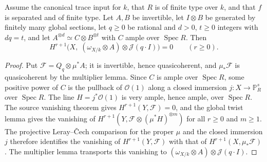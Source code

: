 \begin{theorem}
\label{thm:kn-relative-nadel-multiplier-vanishing}
\leanok
Assume the canonical trace input for $k$, that $R$ is of finite type over $k$,
and that $f$ is separated and of finite type. Let $A,B$ be invertible, let
$I\otimes B$ be generated by finitely many global sections, let $q\geq0$ be
rational and $d>0$, $t\geq0$ integers with $dq=t$, and let
$A^{\otimes d}\simeq C\otimes B^{\otimes t}$ with $C$ ample over
$\operatorname{Spec}R$. Then
\[
 H^{r+1}\bigl(X,\;(\omega_{X/k}\otimes A)\otimes\mathcal J(q\cdot I)\bigr)=0
 \qquad(r\geq0).
\]
\end{theorem}
\begin{proof}
Put $\mathcal F=Q_q\otimes\mu^*A$; it is invertible, hence quasicoherent, and
$\mu_*\mathcal F$ is quasicoherent by the multiplier lemma. Since $C$ is ample
over $\operatorname{Spec}R$, some positive power of $C$ is the pullback of
$\mathcal O(1)$ along a closed immersion $j:X\to\mathbb P^s_R$ over
$\operatorname{Spec}R$. The line $H=j^*\mathcal O(1)$ is very ample, hence
ample, over $\operatorname{Spec}R$. The source vanishing theorem gives
$H^{r+1}(Y,\mathcal F)=0$, and the global twist lemma gives the vanishing of
$H^{r+1}(Y,\mathcal F\otimes(\mu^*H)^{\otimes m})$ for all $r\geq0$ and
$m\geq1$. The projective Leray--\v{C}ech comparison for the proper $\mu$ and
the closed immersion $j$ therefore identifies the vanishing of
$H^{r+1}(Y,\mathcal F)$ with that of $H^{r+1}(X,\mu_*\mathcal F)$. The
multiplier lemma transports this vanishing to
$(\omega_{X/k}\otimes A)\otimes\mathcal J(q\cdot I)$.
\end{proof}

